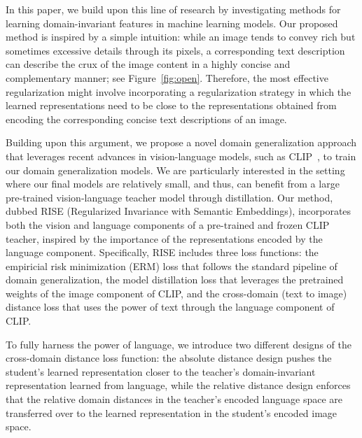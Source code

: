 \documentclass[10pt,twocolumn,letterpaper]{article}
\newcommand{\name}{{\color{black} RISE}}
\begin{document}
In this paper, we build upon this line of research by investigating methods for learning domain-invariant features in machine learning models. Our proposed method is inspired by a simple intuition: while an image tends to convey rich but sometimes excessive details through its pixels, a corresponding text description can describe the crux of the image content in a highly concise and complementary manner; see Figure~\ref{fig:open}. Therefore, the most effective regularization might involve incorporating a regularization strategy in which the learned representations need to be close to the representations obtained from encoding the corresponding concise text descriptions of an image.


Building upon this argument, we propose a novel domain generalization approach that leverages recent advances in vision-language models, such as CLIP~\cite{radford2021learning}, to train our domain generalization models. We are particularly interested in the setting where our final models are relatively small, and thus, can benefit from a large pre-trained vision-language teacher model through distillation.  Our method, dubbed \name{} (Regularized Invariance with Semantic Embeddings), incorporates both the vision and language components of a pre-trained and frozen CLIP teacher, inspired by the importance of the representations encoded by the language component. Specifically, \name{} includes three loss functions: the empiricial risk minimization (ERM) loss that follows the standard pipeline of domain generalization, the model distillation loss that leverages the pretrained weights of the image component of CLIP, and the cross-domain (text to image) distance loss that uses the power of text through the language component of CLIP.

To fully harness the power of language, we introduce two different designs of the cross-domain distance loss function: the absolute distance design pushes the student's learned representation closer to the teacher's domain-invariant representation learned from language, while the relative distance design enforces that the relative domain distances in the teacher's encoded language space are transferred over to the learned representation in the student's encoded image space. 




\vspace{-10pt}
\end{document}
